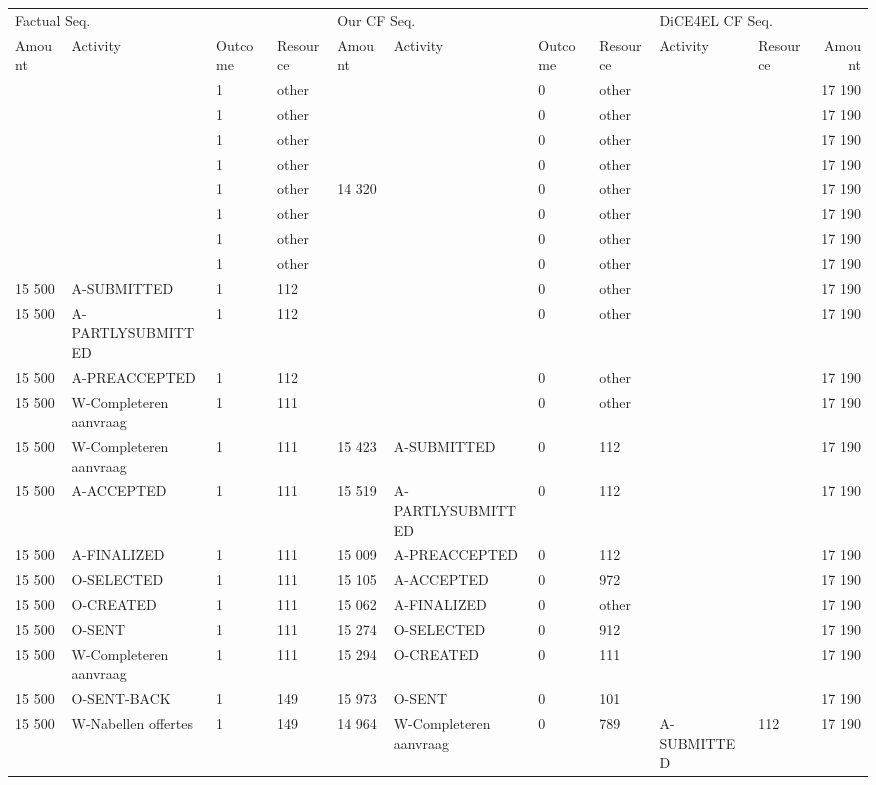 \begin{tabular}{llllllllllr}
\toprule
\multicolumn{4}{l}{Factual Seq.} & \multicolumn{4}{l}{Our CF Seq.} & \multicolumn{3}{l}{DiCE4EL CF Seq.} \\
Amount & Activity & Outcome & Resource & Amount & Activity & Outcome & Resource & Activity & Resource & Amount \\
\midrule
 &  & 1 & other &  &  & 0 & other &  &  & 17 190 \\
 &  & 1 & other &  &  & 0 & other &  &  & 17 190 \\
 &  & 1 & other &  &  & 0 & other &  &  & 17 190 \\
 &  & 1 & other &  &  & 0 & other &  &  & 17 190 \\
 &  & 1 & other & 14 320 &  & 0 & other &  &  & 17 190 \\
 &  & 1 & other &  &  & 0 & other &  &  & 17 190 \\
 &  & 1 & other &  &  & 0 & other &  &  & 17 190 \\
 &  & 1 & other &  &  & 0 & other &  &  & 17 190 \\
15 500 & A-SUBMITTED & 1 & 112 &  &  & 0 & other &  &  & 17 190 \\
15 500 & A-PARTLYSUBMITTED & 1 & 112 &  &  & 0 & other &  &  & 17 190 \\
15 500 & A-PREACCEPTED & 1 & 112 &  &  & 0 & other &  &  & 17 190 \\
15 500 & W-Completeren aanvraag & 1 & 111 &  &  & 0 & other &  &  & 17 190 \\
15 500 & W-Completeren aanvraag & 1 & 111 & 15 423 & A-SUBMITTED & 0 & 112 &  &  & 17 190 \\
15 500 & A-ACCEPTED & 1 & 111 & 15 519 & A-PARTLYSUBMITTED & 0 & 112 &  &  & 17 190 \\
15 500 & A-FINALIZED & 1 & 111 & 15 009 & A-PREACCEPTED & 0 & 112 &  &  & 17 190 \\
15 500 & O-SELECTED & 1 & 111 & 15 105 & A-ACCEPTED & 0 & 972 &  &  & 17 190 \\
15 500 & O-CREATED & 1 & 111 & 15 062 & A-FINALIZED & 0 & other &  &  & 17 190 \\
15 500 & O-SENT & 1 & 111 & 15 274 & O-SELECTED & 0 & 912 &  &  & 17 190 \\
15 500 & W-Completeren aanvraag & 1 & 111 & 15 294 & O-CREATED & 0 & 111 &  &  & 17 190 \\
15 500 & O-SENT-BACK & 1 & 149 & 15 973 & O-SENT & 0 & 101 &  &  & 17 190 \\
15 500 & W-Nabellen offertes & 1 & 149 & 14 964 & W-Completeren aanvraag & 0 & 789 & A-SUBMITTED & 112 & 17 190 \\

\end{tabular}
